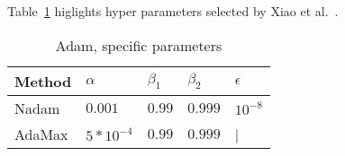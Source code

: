Table~\ref{tab:ensemble-params} higlights hyper parameters selected by Xiao et al.~\cite{xiao_accurate_2019}.
\begin{center}
    \begin{table}[htbp]
    \caption{Adam, specific parameters}
    \label{tab:ensemble-params}
\begin{tabular}{ p{6.0cm} p{1.5cm} p{1.5cm} p{1.5cm} p{1.5cm}  }
    \hline
    Method     & $\alpha$ & $\beta_1 $ & $\beta_2$ &   $\epsilon$ \\
    \hline
    Nadam
            & $0.001$ & $0.99$ & $0.999$ & $10^{-8}$ \\%
    AdaMax
            & $5*10^{-4}$ & $0.99$ & $0.999$ & | \\%
    
    \hline
\end{tabular}
    \end{table}
\end{center}